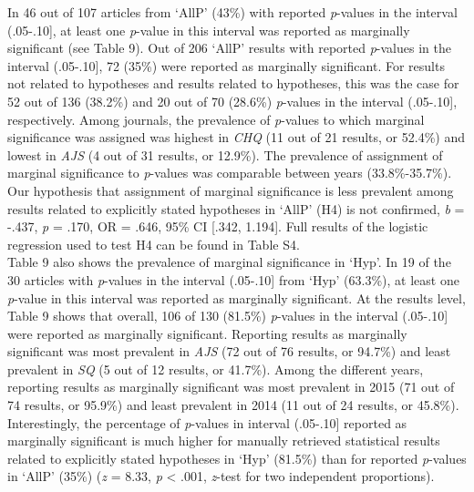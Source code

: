 \documentclass[
  12pt,
]{article}
\begin{document}
In 46 out of 107 articles from `AllP' (43\%) with reported
\emph{p}-values in the interval (.05-.10{]}, at least one \emph{p}-value
in this interval was reported as marginally significant (see Table 9).
Out of 206 `AllP' results with reported \emph{p}-values in the interval
(.05-.10{]}, 72 (35\%) were reported as marginally significant. For
results not related to hypotheses and results related to hypotheses,
this was the case for 52 out of 136 (38.2\%) and 20 out of 70 (28.6\%)
\emph{p}-values in the interval (.05-.10{]}, respectively. Among
journals, the prevalence of \emph{p}-values to which marginal
significance was assigned was highest in \emph{CHQ} (11 out of 21
results, or 52.4\%) and lowest in \emph{AJS} (4 out of 31 results, or
12.9\%). The prevalence of assignment of marginal significance to
\emph{p}-values was comparable between years (33.8\%-35.7\%). Our
hypothesis that assignment of marginal significance is less prevalent
among results related to explicitly stated hypotheses in `AllP' (H4) is
not confirmed, \emph{b} = -.437, \emph{p} = .170, OR = .646, 95\% CI
{[}.342, 1.194{]}. Full results of the logistic regression used to test
H4 can be found in Table S4.\\
\hspace*{0.333em}\hspace*{0.333em}\hspace*{0.333em}\hspace*{0.333em}Table
9 also shows the prevalence of marginal significance in `Hyp'. In 19 of
the 30 articles with \emph{p}-values in the interval (.05-.10{]} from
`Hyp' (63.3\%), at least one \emph{p}-value in this interval was
reported as marginally significant. At the results level, Table 9 shows
that overall, 106 of 130 (81.5\%) \emph{p}-values in the interval
(.05-.10{]} were reported as marginally significant. Reporting results
as marginally significant was most prevalent in \emph{AJS} (72 out of 76
results, or 94.7\%) and least prevalent in \emph{SQ} (5 out of 12
results, or 41.7\%). Among the different years, reporting results as
marginally significant was most prevalent in 2015 (71 out of 74 results,
or 95.9\%) and least prevalent in 2014 (11 out of 24 results, or
45.8\%).\\
\hspace*{0.333em}\hspace*{0.333em}\hspace*{0.333em}\hspace*{0.333em}Interestingly,
the percentage of \emph{p}-values in interval (.05-.10{]} reported as
marginally significant is much higher for manually retrieved statistical
results related to explicitly stated hypotheses in `Hyp' (81.5\%) than
for reported \emph{p}-values in `AllP' (35\%) (\emph{z} = 8.33, \emph{p}
\textless{} .001, \emph{z}-test for two independent proportions).
\end{document}
